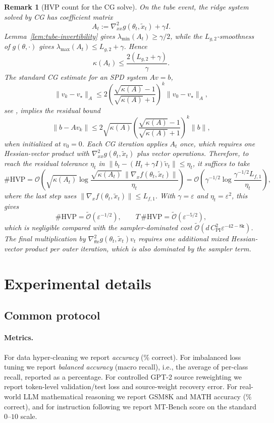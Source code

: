\documentclass{article}
\theoremstyle{normaltheorem}
\newtheorem{remark}[remark]{Remark}
\newcommand{\dimk}{\texttt{k}}
\begin{document}
\begin{remark}[HVP count for the CG solve]\label{rem:hvp-count}
On the tube event, the ridge system solved by CG has coefficient matrix
\[
A_t:=\nabla^2_{xx}g(\theta_t,\tilde x_t)+\gamma I.
\]
Lemma~\ref{lem:tube-invertibility} gives \(\lambda_{\min}(A_t)\ge\gamma/2\), while the \(L_{g,2}\)-smoothness of
\(g(\theta,\cdot)\) gives \(\lambda_{\max}(A_t)\le L_{g,2}+\gamma\). Hence
\[
\kappa(A_t)
\le
\frac{2(L_{g,2}+\gamma)}{\gamma}.
\]
The standard CG estimate for an SPD system \(Av=b\),
\[
\|v_k-v_\star\|_A
\le
2\left(\frac{\sqrt{\kappa(A)}-1}{\sqrt{\kappa(A)}+1}\right)^k
\|v_0-v_\star\|_A,
\]
see \citet[Thm.~5.3]{nocedal2006numerical}, implies the residual bound
\[
\|b-Av_k\|
\le
2\sqrt{\kappa(A)}
\left(\frac{\sqrt{\kappa(A)}-1}{\sqrt{\kappa(A)}+1}\right)^k
\|b\|,
\]
when initialized at \(v_0=0\).
Each CG iteration applies \(A_t\) once, which requires one Hessian-vector product with
\(\nabla^2_{xx}g(\theta_t,\tilde x_t)\) plus vector operations.
Therefore, to reach the residual tolerance \(\eta_t\) in $\|b_t-(H_t+\gamma I)\tilde v_t\|\le \eta_t$, it suffices to take
\[
\#\mathrm{HVP}
=
\mathcal{O}\!\left(
\sqrt{\kappa(A_t)}
\log\frac{\sqrt{\kappa(A_t)}\,\|\nabla_x f(\theta_t,\tilde x_t)\|}{\eta_t}
\right)
=
\mathcal{O}\!\left(
\gamma^{-1/2}\log\frac{\gamma^{-1/2}L_{f,1}}{\eta_t}
\right),
\]
where the last step uses \(\|\nabla_x f(\theta_t,\tilde x_t)\|\le L_{f,1}\).
With \(\gamma=\varepsilon\) and \(\eta_t=\varepsilon^2\), this gives
\[
\#\mathrm{HVP}=\widetilde{\mathcal{O}}(\varepsilon^{-1/2}),
\qquad
T\,\#\mathrm{HVP}=\widetilde{\mathcal{O}}(\varepsilon^{-5/2}),
\]
which is negligible compared with the sampler-dominated cost
\(\widetilde{\mathcal{O}}(d\,C_{\mathrm{PI}}^{2}\varepsilon^{-42-8\dimk})\).
The final multiplication by \(\nabla^2_{\theta x}g(\theta_t,\tilde x_t)v_t\) requires one additional mixed Hessian-vector product per outer iteration, which is also dominated by the sampler term.
\end{remark}

\section{Experimental details}\label{append:exp-details}
\subsection{Common protocol}
\paragraph{Metrics.}
For data hyper-cleaning we report \emph{accuracy} (\% correct).
For imbalanced loss tuning we report \emph{balanced accuracy} (macro recall), i.e., the average of per-class recall,
reported as a percentage.
For controlled GPT-2 source reweighting we report token-level validation/test loss and source-weight recovery error.
For real-world LLM mathematical reasoning we report GSM8K and MATH accuracy (\% correct), and for instruction following
we report MT-Bench score on the standard \(0\)--\(10\) scale.
\end{document}
